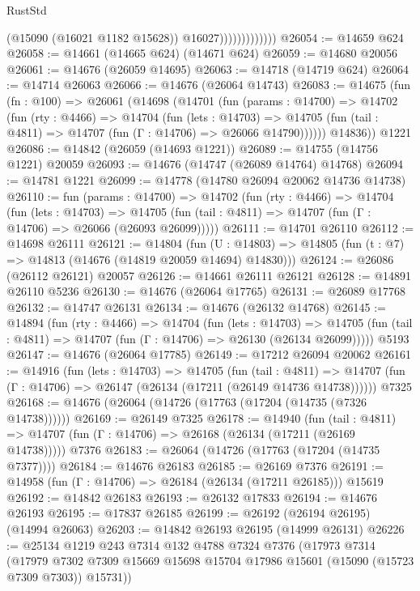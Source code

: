 \begin{lexlean}{RustStd}
\begin{coremodule}
                              (@15090 (@16021 @1182 @15628))
                              @16027)))))))))))))
@26054 := @14659 @624
@26058 := @14661 (@14665 @624) (@14671 @624)
@26059 := @14680 @20056
@26061 := @14676 (@26059 @14695)
@26063 := @14718 (@14719 @624)
@26064 := @14714 @26063
@26066 := @14676 (@26064 @14743)
@26083 := @14675
    (fun (fn : @100) =>
    @26061
      (@14698
        (@14701
          (fun (params : @14700) =>
          @14702
            (fun (rty : @4466) =>
            @14704
              (fun (lets : @14703) =>
              @14705 (fun (tail : @4811) => @14707 (fun (Γ : @14706) => @26066 @14790))))))
        @14836))
    @1221
@26086 := @14842 (@26059 (@14693 @1221))
@26089 := @14755 (@14756 @1221) @20059
@26093 := @14676 (@14747 (@26089 @14764) @14768)
@26094 := @14781 @1221
@26099 := @14778 (@14780 @26094 @20062 @14736 @14738)
@26110 := fun (params : @14700) =>
  @14702
    (fun (rty : @4466) =>
    @14704
      (fun (lets : @14703) =>
      @14705 (fun (tail : @4811) => @14707 (fun (Γ : @14706) => @26066 (@26093 @26099)))))
@26111 := @14701 @26110
@26112 := @14698 @26111
@26121 := @14804
    (fun (U : @14803) => @14805 (fun (t : @7) => @14813 (@14676 (@14819 @20059 @14694) @14830)))
@26124 := @26086 (@26112 @26121) @20057
@26126 := @14661 @26111 @26121
@26128 := @14891 @26110 @5236
@26130 := @14676 (@26064 @17765)
@26131 := @26089 @17768
@26132 := @14747 @26131
@26134 := @14676 (@26132 @14768)
@26145 := @14894
    (fun (rty : @4466) =>
    @14704
      (fun (lets : @14703) =>
      @14705 (fun (tail : @4811) => @14707 (fun (Γ : @14706) => @26130 (@26134 @26099)))))
    @5193
@26147 := @14676 (@26064 @17785)
@26149 := @17212 @26094 @20062
@26161 := @14916
    (fun (lets : @14703) =>
    @14705
      (fun (tail : @4811) =>
      @14707 (fun (Γ : @14706) => @26147 (@26134 (@17211 (@26149 @14736 @14738))))))
    @7325
@26168 := @14676 (@26064 (@14726 (@17763 (@17204 (@14735 (@7326 @14738))))))
@26169 := @26149 @7325
@26178 := @14940
    (fun (tail : @4811) => @14707 (fun (Γ : @14706) => @26168 (@26134 (@17211 (@26169 @14738)))))
    @7376
@26183 := @26064 (@14726 (@17763 (@17204 (@14735 @7377))))
@26184 := @14676 @26183
@26185 := @26169 @7376
@26191 := @14958 (fun (Γ : @14706) => @26184 (@26134 (@17211 @26185))) @15619
@26192 := @14842 @26183
@26193 := @26132 @17833
@26194 := @14676 @26193
@26195 := @17837 @26185
@26199 := @26192 (@26194 @26195) (@14994 @26063)
@26203 := @14842 @26193 @26195 (@14999 @26131)
@26226 := @25134
    @1219
    @243
    @7314
    @132
    @4788
    @7324
    @7376
    (@17973
      @7314
      (@17979 @7302 @7309 @15669 @15698 @15704 @17986 @15601 (@15090 (@15723 @7309 @7303)) @15731))

\end{coremodule}
\end{lexlean}
